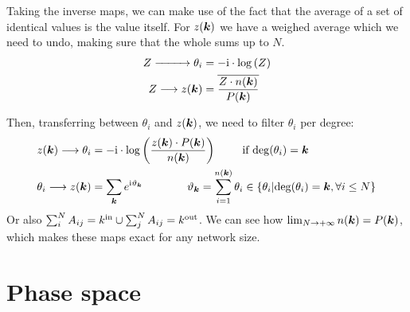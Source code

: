 Taking the inverse maps, we can make use of the fact that the average of a set of identical values is the value itself. For $z({\boldsymbol{k}})$ we have a weighed average which we need to undo, making sure that the whole sums up to $N$.
\begin{align*}
Z \xrightarrow{\hspace*{9mm}} \theta_{i} &= -{\rm{i}} \cdot \log \left( Z \right) \\
Z \longrightarrow z({\boldsymbol{k}}) &= \overline{\frac{Z \cdot n({\boldsymbol{k}})}{P({\boldsymbol{k}})}}
\end{align*}

Then, transferring between $\theta_i$ and $z({\boldsymbol{k}})$, we need to filter $\theta_i$ per degree:
\begin{align*}
z({\boldsymbol{k}}) \longrightarrow \theta_i &= -{\rm{i}} \cdot \log \left( \frac{z({\boldsymbol{k}})\cdot P({\boldsymbol{k}})}{n({\boldsymbol{k}})} \right) \qquad \text{ if } {\rm deg}(\theta_i) = {\boldsymbol{k}} \\
\theta_i \longrightarrow z({\boldsymbol{k}}) &= \sum_{{\boldsymbol{k}}} e^{{\rm{i}} \vartheta_{{\boldsymbol{k}}}} \qquad \qquad \vartheta_{{\boldsymbol{k}}} = \sum_{i = 1}^{n({\boldsymbol{k}})} \theta_i \in 
\left\{ \theta_i \vert {\rm deg}(\theta_i) = {\boldsymbol{k}}, \forall i \leq N \right\}
\end{align*}
Or also $\sum_i^N A_{ij} = k^{\rm in} \cup \sum_j^N A_{ij} = {k^{\rm out}}$. We can see how $\lim_{N \rightarrow +\infty} n({\boldsymbol{k}}) = P({\boldsymbol{k}})$, which makes these maps exact for any network size. 
    
    
\section{Phase space}
